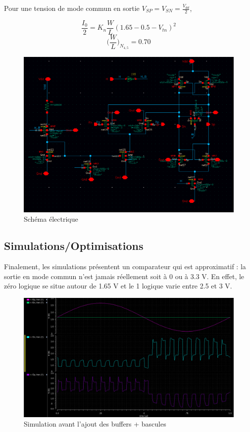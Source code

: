\documentclass[11pt]{article}
\begin{document}
Pour une tension de mode commun en sortie $V_{SP}=V_{SN} = \frac{V_{dd}}{2}$,

\[
  \frac{I_0}{2} = K_n \frac{W}{L}(1.65-0.5 - V_{tn})^2
\]
\[
  \bigg(\frac{W}{L} \bigg)_{N_{4,5}} = 0.70
\]

\clearpage

\begin{figure}[!htb]
      \centering
      \includegraphics[width=0.8\linewidth]{comparateur_schema_cadence_.png}
      \caption{Sch\'ema \'electrique}
      \label{fig:schcomp}
\end{figure}%


\subsection{Simulations/Optimisations}

Finalement, les simulations pr\'esentent un comparateur qui est approximatif : la sortie en mode
commun n'est jamais r\'eellement soit \`a 0 ou \`a 3.3 V. En effet, le z\'ero logique se situe autour de 1.65 V
et le 1 logique varie entre 2.5 et 3 V. 

\begin{figure}[!htb]
      \centering
      \includegraphics[width=0.8\linewidth]{simu_comp_pas_ameliore.png}
      \caption{Simulation avant l'ajout des buffers + bascules}
      \label{fig:sfigBSRFF}
\end{figure}%
\end{document}
